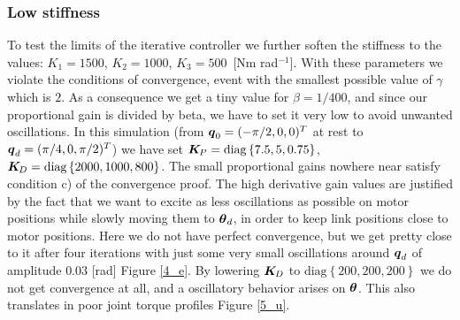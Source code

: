 \subsubsection{Low stiffness}
To test the limits of the iterative controller we further soften the stiffness to the values: $K_1 = 1500$, $K_2 = 1000$, $K_3 = 500$~[Nm rad$^{-1}$]. With these parameters we violate the conditions of convergence, event with the smallest possible value of $\gamma$ which is $2$. As a consequence we get a tiny value for $\beta = 1/400$, and since our proportional gain is divided by beta, we have to set it very low to avoid unwanted oscillations. In this simulation (from ${\boldsymbol{q}}_0=(-\pi/2,0,0)^T$ at rest to ${\boldsymbol{q}}_d=(\pi/4,0,\pi/2)^T$) we have set $\boldsymbol{K}_{\!P} = \mbox{diag}\left\{7.5, 5, 0.75\right\}$, $\boldsymbol{K}_{\!D}=\mbox{diag}\left\{2000,1000,800\right\}$. The small proportional gains nowhere near satisfy condition c) of the convergence proof. 
The high derivative gain values are justified by the fact that we want to excite as less oscillations as possible on motor positions while slowly moving them to $\boldsymbol{\theta}_d$, in order to keep link positions close to motor positions. Here we do not have perfect convergence, but we get pretty close to it after four iterations with just some very small oscillations around ${\boldsymbol{q}}_d$ of amplitude $0.03$ [rad] Figure \ref{4_e}. By lowering $\boldsymbol{K}_{\!D}$ to $\mbox{diag}\left\{200,200,200\right\}$ we do not get convergence at all, and a oscillatory behavior arises on $\boldsymbol{\theta}$. This also translates in poor joint torque profiles Figure \ref{5_u}.

